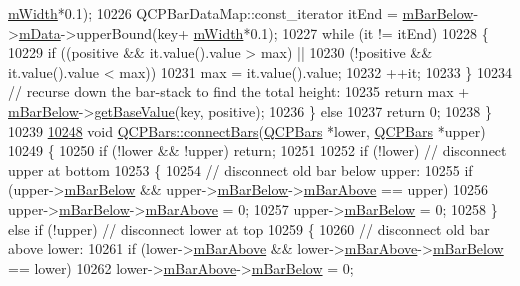 \begin{DoxyCode}
      \hyperlink{a00027_a7c4e0f2246f8133f48a9c3f24cf5b920}{mWidth}*0.1);
10226     QCPBarDataMap::const\_iterator itEnd = \hyperlink{a00027_a02eb7de7a2c03dc5699f329bb1c5f6e1}{mBarBelow}->\hyperlink{a00027_aef28d29d51ef84b608ecd22c55d531ff}{mData}->upperBound(key+
      \hyperlink{a00027_a7c4e0f2246f8133f48a9c3f24cf5b920}{mWidth}*0.1);
10227     \textcolor{keywordflow}{while} (it != itEnd)
10228     \{
10229       \textcolor{keywordflow}{if} ((positive && it.value().value > max) ||
10230           (!positive && it.value().value < max))
10231         max = it.value().value;
10232       ++it;
10233     \}
10234     \textcolor{comment}{// recurse down the bar-stack to find the total height:}
10235     \textcolor{keywordflow}{return} max + \hyperlink{a00027_a02eb7de7a2c03dc5699f329bb1c5f6e1}{mBarBelow}->\hyperlink{a00027_ab60a3c4b8e7c59f0f14e25590d96fa4e}{getBaseValue}(key, positive);
10236   \} \textcolor{keywordflow}{else}
10237     \textcolor{keywordflow}{return} 0;
10238 \}
10239 
\hypertarget{a00115_source_l10248}{}\hyperlink{a00027_a6ea37802cd22f97235cab614b14b9f19}{10248} \textcolor{keywordtype}{void} \hyperlink{a00027_a6ea37802cd22f97235cab614b14b9f19}{QCPBars::connectBars}(\hyperlink{a00027}{QCPBars} *lower, \hyperlink{a00027}{QCPBars} *upper)
10249 \{
10250   \textcolor{keywordflow}{if} (!lower && !upper) \textcolor{keywordflow}{return};
10251   
10252   \textcolor{keywordflow}{if} (!lower) \textcolor{comment}{// disconnect upper at bottom}
10253   \{
10254     \textcolor{comment}{// disconnect old bar below upper:}
10255     \textcolor{keywordflow}{if} (upper->\hyperlink{a00027_a02eb7de7a2c03dc5699f329bb1c5f6e1}{mBarBelow} && upper->\hyperlink{a00027_a02eb7de7a2c03dc5699f329bb1c5f6e1}{mBarBelow}->\hyperlink{a00027_ade19776a2a6d393f15c0e27d4bb8e594}{mBarAbove} == upper)
10256       upper->\hyperlink{a00027_a02eb7de7a2c03dc5699f329bb1c5f6e1}{mBarBelow}->\hyperlink{a00027_ade19776a2a6d393f15c0e27d4bb8e594}{mBarAbove} = 0;
10257     upper->\hyperlink{a00027_a02eb7de7a2c03dc5699f329bb1c5f6e1}{mBarBelow} = 0;
10258   \} \textcolor{keywordflow}{else} \textcolor{keywordflow}{if} (!upper) \textcolor{comment}{// disconnect lower at top}
10259   \{
10260     \textcolor{comment}{// disconnect old bar above lower:}
10261     \textcolor{keywordflow}{if} (lower->\hyperlink{a00027_ade19776a2a6d393f15c0e27d4bb8e594}{mBarAbove} && lower->\hyperlink{a00027_ade19776a2a6d393f15c0e27d4bb8e594}{mBarAbove}->\hyperlink{a00027_a02eb7de7a2c03dc5699f329bb1c5f6e1}{mBarBelow} == lower)
10262       lower->\hyperlink{a00027_ade19776a2a6d393f15c0e27d4bb8e594}{mBarAbove}->\hyperlink{a00027_a02eb7de7a2c03dc5699f329bb1c5f6e1}{mBarBelow} = 0;

\end{DoxyCode}
